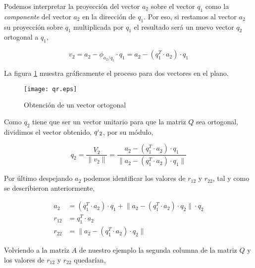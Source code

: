 Podemos interpretar la proyección del vector $a_2$ sobre el vector $q_1$ como la \emph{componente} del vector $a_2$ en la dirección de $q_1$. Por eso, si restamos al vector $a_2$ su proyección sobre $q_1$ multiplicada por $q_1$ el resultado será un nuevo vector $q_2$ ortogonal a $q_1$,

\begin{equation*}v_2=a_2-\phi_{a_2/q_1}\cdot q_1=a_2-(q_1^T\cdot a_2)\cdot q_1
\end{equation*}

La figura \ref{fig:qr} muestra gráficamente el proceso para dos vectores en el plano.

\begin{figure}[h]
\centering
\texttt{[image: qr.eps]}
\caption{Obtención de un vector ortogonal}
\label{fig:qr}
\end{figure}

Como $q_2$ tiene que ser un vector unitario para que la matriz $Q$ sea ortogonal, dividimos el vector obtenido, $q`_2$, por su módulo,

\begin{equation*}
q_2=\frac{V_2}{\lVert v_2 \rVert}=\frac{a_2-(q_1^T\cdot a_2)\cdot q_1}{\lVert a_2-(q_1^T\cdot a_2)\cdot q_1 \rVert}
\end{equation*}

Por último despejando $a_2$ podemos identificar los valores de $r_{12}$ y $r_{22}$, tal y como se describieron anteriormente,

\begin{align*}
a_2&= (q_1^T\cdot a_2)\cdot q_1+\lVert a_2-(q_1^T\cdot a_2)\cdot q_2 \rVert \cdot q_2\\
r_{12}&=q_1^T\cdot a_2\\
r_{22}&=\lVert a_2-(q_1^T\cdot a_2)\cdot q_2 \rVert 
 \end{align*}

Volviendo a la matriz $A$ de nuestro ejemplo la segunda columna de la matriz $Q$ y los valores de $r_{12}$ y $r_{22}$ quedarían,



